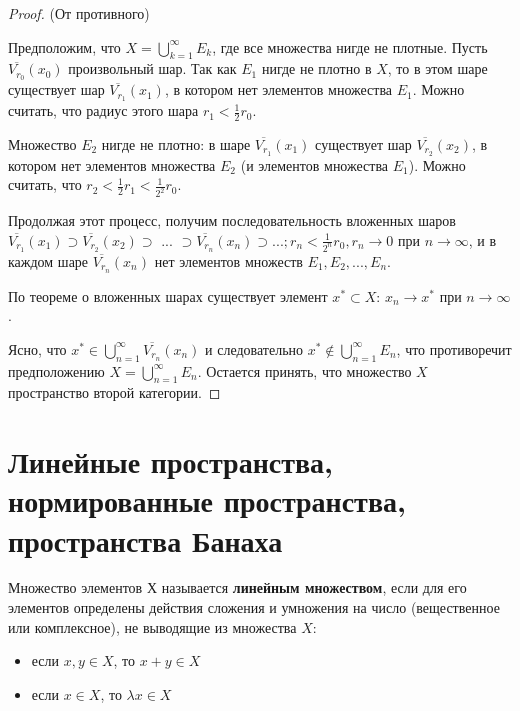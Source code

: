 \documentclass[12pt,a4paper,titlepage]{book}
\theoremstyle{definition}
\theoremstyle{plain}
\theoremstyle{remark}
\theoremstyle{remark}
\theoremstyle{remark}
\theoremstyle{plain}
\begin{document}
\begin{proof}
(От противного)

Предположим, что $X=\bigcup\limits_{k=1}^\infty E_k$, где все множества нигде не плотные. Пусть $\overline{V_{r_0}}(x_0)$ произвольный шар. Так как $E_1$ нигде не плотно в $X$, то в этом шаре существует шар $\overline{V_{r_1}}(x_1)$, в котором нет элементов множества $E_1$. Можно считать, что радиус этого шара $r_1 < \frac{1}{2}r_0$.

Множество $E_2$ нигде не плотно: в шаре $\overline{V_{r_1}}(x_1)$ существует шар $\overline{V_{r_2}}(x_2)$, в котором нет элементов множества $E_2$ (и элементов множества $E_1$). Можно считать, что $r_2 < \frac{1}{2}r_1 < \frac{1}{2^2}r_0$.

Продолжая этот процесс, получим последовательность вложенных шаров $\overline{V_{r_1}}(x_1) \supset \overline{V_{r_2}}(x_2) \supset$ ... $\supset \overline{V_{r_n}}(x_n) \supset ...; r_n < \frac{1}{2^n}r_0, r_n \rightarrow 0$ при $n \rightarrow \infty$, и в каждом шаре $\overline{V_{r_n}}(x_n)$ нет элементов множеств $E_1, E_2, ..., E_n$.

По теореме о вложенных шарах существует элемент $x^*\subset X$:
$x_n \rightarrow x^*$ при $n \rightarrow \infty$.

Ясно, что $x^*\in \bigcup\limits_{n=1}^\infty \overline{V_{r_n}}(x_n)$ и следовательно $x^*\notin \bigcup\limits_{n=1}^\infty E_n$, что противоречит предположению $X=\bigcup\limits_{n=1}^\infty E_n$. Остается принять, что множество $X$ пространство второй категории.

\end{proof}

\section{Линейные пространства, нормированные пространства, пространства Банаха}

Множество элементов $Х$ называется \textbf{линейным множеством}, если для его элементов определены действия сложения и умножения на число (вещественное или комплексное), не выводящие из множества $X$:

\begin{itemize}

	\item если $x,y\in X$, то $x+y\in X$

	\item если $x\in X$, то $\lambda x\in X$

\end{itemize}
\end{document}

